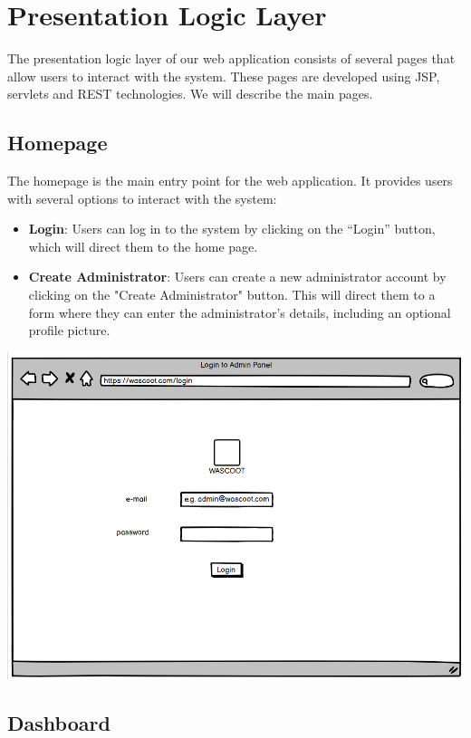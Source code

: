 \section{Presentation Logic Layer}

The presentation logic layer of our web application consists of several pages that allow users to interact with the system. These pages are developed using JSP, servlets and REST technologies.
We will describe the main pages.

\subsection{Homepage}

The homepage is the main entry point for the web application. It provides users with several options to interact with the system:

\begin{itemize}
\item \textbf{Login}: Users can log in to the system by clicking on the “Login” button, which will direct them to the home page.
\item \textbf{Create Administrator}: Users can create a new administrator account by clicking on the "Create Administrator" button. This will direct them to a form where they can enter the administrator's details, including an optional profile picture.
\end{itemize}

\includegraphics[scale = 0.7]{sections/DLL/Login.png}

\subsection{Dashboard}

